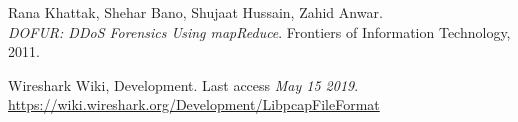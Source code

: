 \newpage
\begin{thebibliography}{9}
Rana Khattak, Shehar Bano, Shujaat Hussain, Zahid Anwar. 
\\\textit{DOFUR: DDoS Forensics Using mapReduce}. Frontiers of Information Technology, 2011.

Wireshark Wiki, Development. Last access \textit{May 15 2019}.
\\\url{https://wiki.wireshark.org/Development/LibpcapFileFormat}
\end{thebibliography}